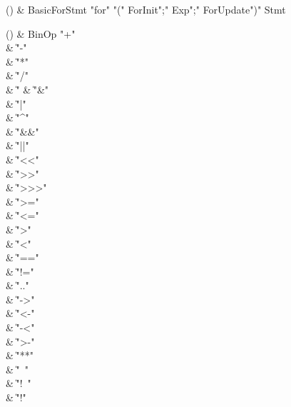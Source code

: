 \begin{bbgrammarappendix}{3.8in}

() & BasicForStmt \label{prod:BasicForStmt}  \: \xcd"for" \xcd"(" ForInit\opt \xcd";" Exp\opt \xcd";" ForUpdate\opt \xcd")" Stmt  \\


\end{bbgrammarappendix}

\begin{bbgrammarappendix}{4.5in}

() & BinOp \label{prod:BinOp}  \: \xcd"+"  \\

 &    \| \xcd"-" \\
 &    \| \xcd"*" \\
 &    \| \xcd"/" \\
 &    \| \xcd"%
 &    \| \xcd"&" \\
 &    \| \xcd"|" \\
 &    \| \xcd"^" \\
 &    \| \xcd"&&" \\
 &    \| \xcd"||" \\
 &    \| \xcd"<<" \\
 &    \| \xcd">>" \\
 &    \| \xcd">>>" \\
 &    \| \xcd">=" \\
 &    \| \xcd"<=" \\
 &    \| \xcd">" \\
 &    \| \xcd"<" \\
 &    \| \xcd"==" \\
 &    \| \xcd"!=" \\
 &    \| \xcd".." \\
 &    \| \xcd"->" \\
 &    \| \xcd"<-" \\
 &    \| \xcd"-<" \\
 &    \| \xcd">-" \\
 &    \| \xcd"**" \\
 &    \| \xcd"~" \\
 &    \| \xcd"!~" \\
 &    \| \xcd"!" \\

\end{bbgrammarappendix}

